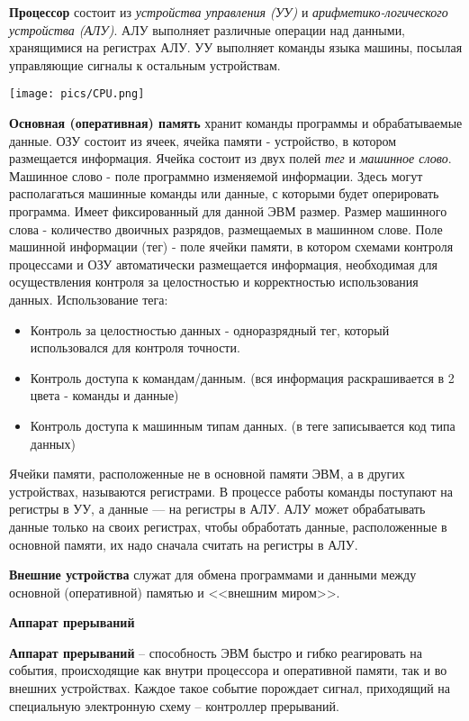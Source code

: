 \textbf{Процессор} состоит из \textit{устройства управления (УУ)} и \textit{арифметико-логического устройства (АЛУ)}. АЛУ выполняет различные операции над данными, хранящимися на регистрах АЛУ. УУ выполняет команды языка машины, посылая управляющие сигналы к остальным устройствам.

\texttt{[image: pics/CPU.png]}

\textbf{Основная (оперативная) память} хранит команды программы и обрабатываемые данные. ОЗУ состоит из ячеек, ячейка памяти - устройство, в котором размещается информация. Ячейка состоит из двух полей \textit{тег} и \textit{машинное слово}. Машинное слово - поле программно изменяемой информации. Здесь могут располагаться машинные команды или данные, с которыми будет оперировать программа. Имеет фиксированный для данной ЭВМ размер. Размер машинного слова - количество двоичных разрядов, размещаемых в машинном слове. Поле машинной информации (тег) - поле ячейки памяти, в котором схемами контроля процессами и ОЗУ автоматически размещается информация, необходимая для осуществления контроля за целостностью и корректностью использования данных. Использование тега:
\begin{itemize}
    \item Контроль за целостностью данных - одноразрядный тег, который использовался для контроля точности.
    \item Контроль доступа к командам/данным. (вся информация раскрашивается в 2 цвета - команды и данные)
    \item Контроль доступа к машинным типам данных. (в теге записывается код типа данных)
\end{itemize}

Ячейки памяти, расположенные не в основной памяти ЭВМ, а в других устройствах, называются регистрами. В процессе работы команды поступают на регистры в УУ, а данные --- на регистры в АЛУ. АЛУ может обрабатывать данные только на своих регистрах, чтобы обработать данные, расположенные в основной памяти, их надо сначала считать на регистры в АЛУ.

\textbf{Внешние устройства} служат для обмена программами и данными между основной (оперативной) памятью и <<внешним миром>>.


\centerline{\textbf{Аппарат прерываний}}

\textbf{Аппарат прерываний} -- способность ЭВМ быстро и гибко реагировать на события, происходящие как внутри процессора и оперативной памяти, так и во внешних устройствах. Каждое такое событие порождает сигнал, приходящий на специальную электронную схему -- контроллер прерываний.


